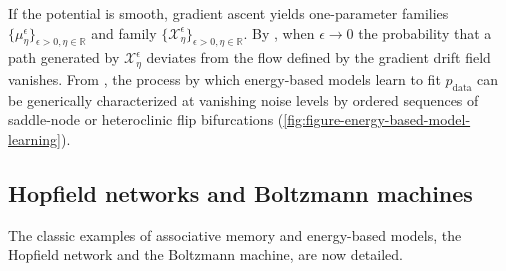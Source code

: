 \documentclass[12pt]{article}
\newcommand\colorAutoref[1]{{\hypersetup{linkcolor=blue}\autoref{#1}}}  %
\begin{document}
If the potential is smooth, gradient ascent yields one-parameter families $\{\mu^{\epsilon}_\eta\}_{\epsilon > 0, \eta \in \mathbb{R}}$ and family $\{\mathcal{X}^{\epsilon}_\eta\}_{\epsilon > 0, \eta \in \mathbb{R}}$. By , when $\epsilon \rightarrow 0$ the probability that a path generated by $\mathcal{X}^{\epsilon}_\eta$ deviates from the flow defined by the gradient drift field vanishes. From , the process by which energy-based models learn to fit $p_{\text{data}}$ can be generically characterized at vanishing noise levels by ordered sequences of saddle-node or heteroclinic flip bifurcations (\colorAutoref{fig:figure-energy-based-model-learning}).



\subsection{Hopfield networks and Boltzmann machines}
\label{subsection:applications-hopfield-boltzmann-models}
The classic examples of associative memory and energy-based models, the Hopfield network and the Boltzmann machine, are now detailed.


\end{document}
